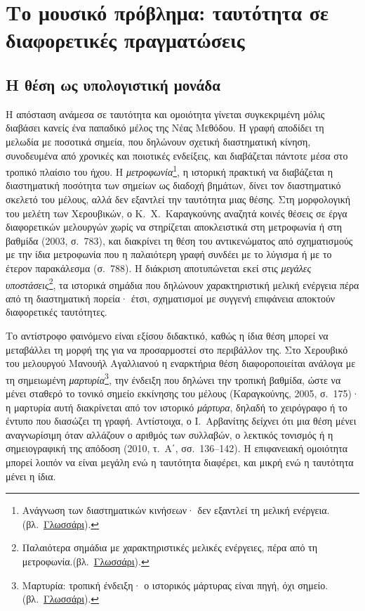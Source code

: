 \documentclass[a4paper]{article}
\newcommand{\musnote}[2]{\footnote{#2\enspace(βλ.~\hyperlink{gl:#1}{Γλωσσάρι}).}}
\begin{document}
\section{Το μουσικό πρόβλημα: ταυτότητα σε διαφορετικές πραγματώσεις}\label{sec:intro}
\subsection{Η θέση ως υπολογιστική μονάδα}\label{sec:unit}
Η απόσταση ανάμεσα σε ταυτότητα και ομοιότητα γίνεται συγκεκριμένη μόλις διαβάσει κανείς ένα παπαδικό μέλος της Νέας Μεθόδου. Η γραφή αποδίδει τη μελωδία με ποσοτικά σημεία, που δηλώνουν σχετική διαστηματική κίνηση, συνοδευμένα από χρονικές και ποιοτικές ενδείξεις, και διαβάζεται πάντοτε μέσα στο τροπικό πλαίσιο του ήχου. Η \emph{μετροφωνία}\musnote{metrophonia}{Ανάγνωση των διαστηματικών κινήσεων· δεν εξαντλεί τη μελική ενέργεια.}, η ιστορική πρακτική να διαβάζεται η διαστηματική ποσότητα των σημείων ως διαδοχή βημάτων, δίνει τον διαστηματικό σκελετό του μέλους, αλλά δεν εξαντλεί την ταυτότητα μιας θέσης. Στη μορφολογική του μελέτη των Χερουβικών, ο Κ.~Χ.~Καραγκούνης αναζητά κοινές θέσεις σε έργα διαφορετικών μελουργών χωρίς να στηρίζεται αποκλειστικά στη μετροφωνία ή στη βαθμίδα (2003, σ.~783), και διακρίνει τη θέση του αντικενώματος από σχηματισμούς με την ίδια μετροφωνία που η παλαιότερη γραφή συνδέει με το λύγισμα ή με το έτερον παρακάλεσμα (σ.~788). Η διάκριση αποτυπώνεται εκεί στις \emph{μεγάλες υποστάσεις}\musnote{great-signs}{Παλαιότερα σημάδια με χαρακτηριστικές μελικές ενέργειες, πέρα από τη μετροφωνία.}, τα ιστορικά σημάδια που δηλώνουν χαρακτηριστική μελική ενέργεια πέρα από τη διαστηματική πορεία· έτσι, σχηματισμοί με συγγενή επιφάνεια αποκτούν διαφορετικές ταυτότητες.

Το αντίστροφο φαινόμενο είναι εξίσου διδακτικό, καθώς η ίδια θέση μπορεί να μεταβάλλει τη μορφή της για να προσαρμοστεί στο περιβάλλον της. Στο Χερουβικό του μελουργού Μανουήλ Αγαλλιανού η εναρκτήρια θέση διαφοροποιείται ανάλογα με τη σημειωμένη \emph{μαρτυρία}\musnote{martyria}{Μαρτυρία: τροπική ένδειξη· ο ιστορικός μάρτυρας είναι πηγή, όχι σημείο.}, την ένδειξη που δηλώνει την τροπική βαθμίδα, ώστε να μένει σταθερό το τονικό σημείο εκκίνησης του μέλους (Καραγκούνης, 2005, σ.~175)· η μαρτυρία αυτή διακρίνεται από τον ιστορικό \emph{μάρτυρα}, δηλαδή το χειρόγραφο ή το έντυπο που διασώζει τη γραφή. Αντίστοιχα, ο Ι.~Αρβανίτης δείχνει ότι μια θέση μένει αναγνωρίσιμη όταν αλλάζουν ο αριθμός των συλλαβών, ο λεκτικός τονισμός ή η σημειογραφική της απόδοση (2010, τ.~Α΄, σσ.~136--142). Η επιφανειακή ομοιότητα μπορεί λοιπόν να είναι μεγάλη ενώ η ταυτότητα διαφέρει, και μικρή ενώ η ταυτότητα μένει η ίδια.
\end{document}

